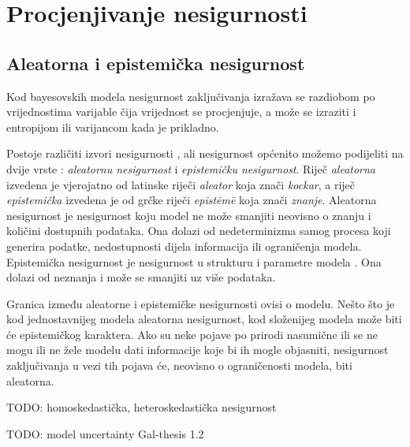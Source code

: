 \documentclass[utf8, diplomski, lmodern]{fer}
\begin{document}
\chapter{Procjenjivanje nesigurnosti}



\section{Aleatorna i epistemička nesigurnost}

Kod bayesovskih modela nesigurnost zaključivanja izražava se razdiobom po vrijednostima varijable čija vrijednost se procjenjuje, a može se izraziti i entropijom ili varijancom kada je prikladno.

Postoje različiti izvori nesigurnosti \citep{Kennedy:2002:BCCM}, ali nesigurnost općenito možemo podijeliti na dvije vrste \citep{Kiureghian:2009:AEDM}: \emph{aleatornu nesigurnost} i \emph{epistemičku nesigurnost}. Riječ \textit{aleatorna} izvedena je vjerojatno od latinske riječi \textit{aleator} \citep{Gal:2016:UDL} koja znači \textit{kockar}, a riječ \textit{epistemička} izvedena je od grčke riječi \textit{epist\={e}m\={e}} koja znači \textit{znanje}. Aleatorna nesigurnost je nesigurnost koju model ne može smanjiti neovisno o znanju i količini dostupnih podataka. Ona dolazi od nedeterminizma samog procesa koji generira podatke, nedostupnosti dijela informacija ili ograničenja modela. Epistemička nesigurnost je nesigurnost u strukturu i parametre modela \citet{Gal:2016:UDL}. Ona dolazi od neznanja i može se smanjiti uz više podataka.

Granica između aleatorne i epistemičke nesigurnosti ovisi o modelu. Nešto što je kod jednostavnijeg modela aleatorna nesigurnost, kod složenijeg modela može biti će epistemičkog karaktera. Ako su neke pojave po prirodi nasumične ili se ne mogu ili ne žele modelu dati informacije koje bi ih mogle objasniti, nesigurnost zaključivanja u vezi tih pojava će, neovisno o ograničenosti modela, biti aleatorna.

TODO: homoskedastička, heteroskedastička nesigurnost

TODO: model uncertainty Gal-thesis 1.2
\end{document}

